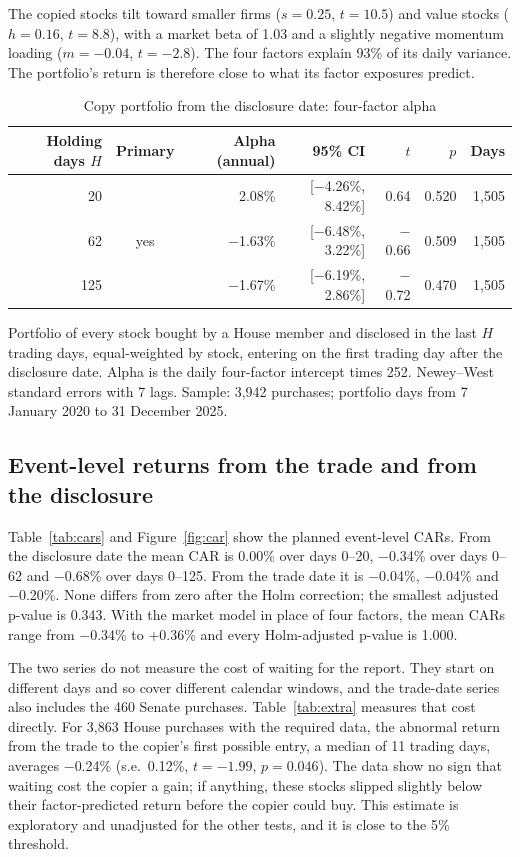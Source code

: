 \documentclass[11pt]{article}
\newcommand{\m}{\ensuremath{-}}
\begin{document}
The copied stocks tilt toward smaller firms ($s = 0.25$, $t = 10.5$) and value stocks ($h = 0.16$, $t = 8.8$), with a market beta of 1.03 and a slightly negative momentum loading ($m = \m0.04$, $t = \m2.8$). The four factors explain 93\% of its daily variance. The portfolio's return is therefore close to what its factor exposures predict.

\begin{table}[t]
\centering
\caption{Copy portfolio from the disclosure date: four-factor alpha}\label{tab:calendar}
\begin{tabular}{rcrrrrr}
\toprule
Holding days $H$ & Primary & Alpha (annual) & 95\% CI & $t$ & $p$ & Days \\
\midrule
20 & & 2.08\% & [\m4.26\%, 8.42\%] & 0.64 & 0.520 & 1,505 \\
62 & yes & \m1.63\% & [\m6.48\%, 3.22\%] & \m0.66 & 0.509 & 1,505 \\
125 & & \m1.67\% & [\m6.19\%, 2.86\%] & \m0.72 & 0.470 & 1,505 \\
\bottomrule
\end{tabular}

\smallskip
\parbox{0.9\linewidth}{\footnotesize Portfolio of every stock bought by a House member and disclosed in the last $H$ trading days, equal-weighted by stock, entering on the first trading day after the disclosure date. Alpha is the daily four-factor intercept times 252. Newey--West standard errors with 7 lags. Sample: 3,942 purchases; portfolio days from 7 January 2020 to 31 December 2025.}
\end{table}

\subsection{Event-level returns from the trade and from the disclosure}

Table~\ref{tab:cars} and Figure~\ref{fig:car} show the planned event-level CARs. From the disclosure date the mean CAR is 0.00\% over days 0--20, \m0.34\% over days 0--62 and \m0.68\% over days 0--125. From the trade date it is \m0.04\%, \m0.04\% and \m0.20\%. None differs from zero after the Holm correction; the smallest adjusted p-value is 0.343. With the market model in place of four factors, the mean CARs range from \m0.34\% to +0.36\% and every Holm-adjusted p-value is 1.000.

The two series do not measure the cost of waiting for the report. They start on different days and so cover different calendar windows, and the trade-date series also includes the 460 Senate purchases. Table~\ref{tab:extra} measures that cost directly. For 3,863 House purchases with the required data, the abnormal return from the trade to the copier's first possible entry, a median of 11 trading days, averages \m0.24\% (s.e.\ 0.12\%, $t = \m1.99$, $p = 0.046$). The data show no sign that waiting cost the copier a gain; if anything, these stocks slipped slightly below their factor-predicted return before the copier could buy. This estimate is exploratory and unadjusted for the other tests, and it is close to the 5\% threshold.
\end{document}
